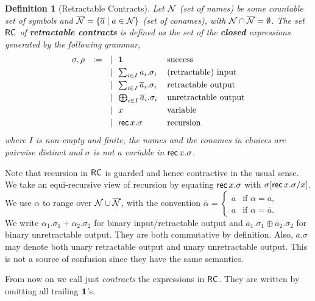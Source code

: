 \documentclass[UKenglish]{eptcs}
\newtheorem{definition}{Definition}[section]
\newcommand{\Dual}[1]{\overline{#1}}
\newcommand{\Set}[1]{\{#1\}}
\newcommand{\rec}{{\sf rec} \, }
\newcommand{\Names}{{\cal N}}
\newcommand{\CoNames}{\overline{\Names}}
\newcommand{\stopA}{{\bf 1}}
\newcommand{\Sbehav}{{\sf RC}}
\newcommand{\s}{\Sbehav}
\newcommand{\ctrs}{contracts}
\newcommand{\Ctrs}{Contracts}
\begin{document}
\begin{definition}[Retractable \Ctrs]
\label{Adef:ckpt-behav}
Let $\Names$ {\em (set of names)} be some countable set of symbols and $\CoNames = \Set{\Dual{a} \mid a \in \Names}$ {\em (set of conames)}, with
$\Names\cap\CoNames = \emptyset$. 
The set $\s$ of {\bf retractable \ctrs} is defined as the set of the {\bf closed} expressions generated by the following 
grammar, 
\[\begin{array}{lcl@{\hspace{4mm}}l}
\sigma,\rho&:=& \mid ~ \stopA &\mbox{success} \\[1mm]
       &     & \mid ~\sum_{i\in I} a_i.\sigma_i  & \mbox{(retractable) input} \\[1mm]
       &     & \mid ~\sum_{i\in I} \Dual{a}_i.\sigma_i& \mbox{retractable output}\\[1mm]
       &     & \mid ~\bigoplus_{i\in I} \Dual{a}_i.\sigma_i & \mbox{unretractable output}\\[1mm]
       &     & \mid  ~x  & \mbox{variable}\\[1mm]
       &     & \mid ~\rec x. \sigma &  \mbox{recursion}
\end{array}
\]
where $I$ is non-empty and finite, the names and  the conames in choices are pairwise distinct and $\sigma$ is not a variable in $\rec x.\sigma$.
\end{definition}
\noindent
Note that recursion in $\s$ is guarded and hence contractive in the usual sense. We take an equi-recursive view of recursion by equating $\rec x.\sigma  $ with $\sigma[\rec x.\sigma/x]$. We use $\alpha$ to range over $\Names\cup\CoNames$,
with the convention $\Dual{\alpha}=\begin{cases}
 \Dual{a}     & \text{if }\alpha=a, \\
    a  & \text{if }\alpha=\Dual{a}.
\end{cases}$ \\
We write $\alpha_1.\sigma_1 + \alpha_2.\sigma_2$ for binary
input/retractable output and $\Dual{a}_1.\sigma_1 \oplus
\Dual{a}_2.\sigma_2$ for binary unretractable output. They are both
commutative by definition. Also, $\Dual{a}.\sigma$ may denote both unary
retractable output and unary unretractable output. This is not a
source of confusion since they have the same semantics.
\medskip

\noindent
From now on we call just {\em \ctrs} the expressions in $\s$. They are written by omitting all trailing $\stopA$'s.

\medskip
\end{document}

